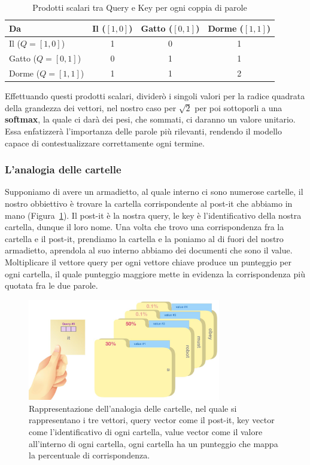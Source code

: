 \begin{table}[!ht]
    \centering
    \caption{Prodotti scalari tra Query e Key per ogni coppia di parole}
    \begin{tabular}{@{}lccc@{}}
        \toprule
        \textbf{Da} & \textbf{Il ($[1, 0]$)} & \textbf{Gatto ($[0, 1]$)} & \textbf{Dorme ($[1, 1]$)} \\
        \midrule
        Il ($Q = [1, 0]$)     & 1 & 0 & 1 \\
        Gatto ($Q = [0, 1]$)  & 0 & 1 & 1 \\
        Dorme ($Q = [1, 1]$)  & 1 & 1 & 2 \\
        \bottomrule
    \end{tabular}
\end{table}

Effettuando questi prodotti scalari, dividerò i singoli valori per la radice quadrata della grandezza dei vettori, nel nostro caso per $\sqrt{2}$ per poi sottoporli a una \textbf{softmax}, la quale ci darà dei pesi, che sommati, ci daranno un valore unitario. Essa enfatizzerà l'importanza delle parole più rilevanti, rendendo il modello capace di contestualizzare correttamente ogni termine.

\subsubsection{L'analogia delle cartelle}
Supponiamo di avere un armadietto, al quale interno ci sono numerose cartelle, il nostro obbiettivo è trovare la cartella corrispondente al post-it che abbiamo in mano (Figura~\ref{fig:folderAn}). Il post-it è la nostra query, le key è l'identificativo della nostra cartella, dunque il loro nome. Una volta che trovo una corrispondenza fra la cartella e il post-it, prendiamo la cartella e la poniamo al di fuori del nostro armadietto, aprendola al suo interno abbiamo dei documenti che sono il value. Moltiplicare il vettore query per ogni vettore chiave produce un punteggio per ogni cartella, il quale punteggio maggiore mette in evidenza la corrispondenza più quotata fra le due parole.

\begin{figure}[hbtp]
    \centering
    \includegraphics[width=0.75\textwidth]{figure/FoldeAnalogy.png}
    \caption{Rappresentazione dell'analogia delle cartelle, nel quale si rappresentano i tre vettori, query vector come il post-it, key vector come l'identificativo di ogni cartella, value vector come il valore all'interno di ogni cartella, ogni cartella ha un punteggio che mappa la percentuale di corrispondenza.}
    \label{fig:folderAn}
\end{figure}

